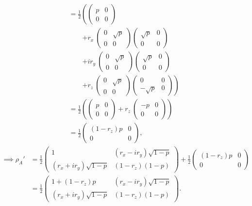 \documentclass{scrartcl}
\newcommand{\inv}[1]{\frac{1}{#1}}
\DeclareRobustCommand{\[}{\begin{equation}}
\DeclareRobustCommand{\]}{\end{equation}}
\begin{document}
\begin{enumerate}
\begin{enumerate}[a)]
\begin{align}
                &= \inv{2} \left( \begin{pmatrix} p & 0 \\ 0 & 0 \end{pmatrix} \right. \\
                &\quad \quad \left. + r_x \ \begin{pmatrix} 0 & \sqrt{p} \\ 0 & 0 \end{pmatrix} \begin{pmatrix} \sqrt{p} & 0 \\ 0 & 0 \end{pmatrix} \right. \\
                &\quad \quad \left. + i r_y \ \begin{pmatrix} 0 & \sqrt{p} \\ 0 & 0 \end{pmatrix} \begin{pmatrix} \sqrt{p} & 0 \\ 0 & 0 \end{pmatrix} \right. \\
                &\quad \quad \left. + r_z \ \begin{pmatrix} 0 & \sqrt{p} \\ 0 & 0 \end{pmatrix} \begin{pmatrix} 0 & 0 \\ -\sqrt{p} & 0 \end{pmatrix} \right) \\
                &= \inv{2} \left( \begin{pmatrix} p & 0 \\ 0 & 0 \end{pmatrix} + r_z \ \begin{pmatrix} -p & 0 \\ 0 & 0 \end{pmatrix} \right) \\
                &= \inv{2} \begin{pmatrix} (1 - r_z) p & 0 \\ 0 & 0 \end{pmatrix},
        \end{align}
        \begin{align}
            \implies \rho_A' &= \inv{2} \begin{pmatrix} 1 & (r_x - i r_y) \sqrt{1 - p} \\ (r_x + i r_y) \sqrt{1 - p} & (1 - r_z)(1 - p) \end{pmatrix} + \inv{2} \begin{pmatrix} (1 - r_z) p & 0 \\ 0 & 0 \end{pmatrix} \\
                &= \inv{2} \begin{pmatrix} 1 + (1 - r_z) p & (r_x - i r_y) \sqrt{1 - p} \\ (r_x + i r_y) \sqrt{1 - p} & (1 - r_z)(1 - p) \end{pmatrix}.
        \end{align}
        

\end{enumerate}
\end{enumerate}
\end{document}
